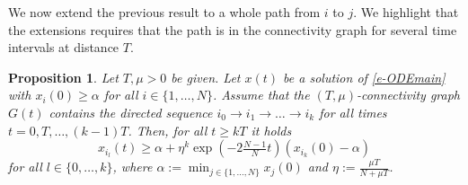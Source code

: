 \documentclass[journal]{article}
\newtheorem{proposition}[lemma]{Proposition}
\begin{document}
We now extend the previous result to a whole path from $i$ to $j$. We highlight that the extensions requires that the path is in the connectivity graph for several time intervals at distance $T$.
\begin{proposition}\label{p-keylemma}Let $T,\mu>0$ be given. Let $x(t)$ be a solution of \eqref{e-ODEmain} with $x_i(0)\geq \alpha$ for all $i\in\{1,\ldots,N\}$. Assume that the $(T,\mu)$-connectivity graph $G(t)$ contains the directed sequence ${i_0}\to {i_1}\to\ldots \to {i_k}$ for all times $t=0,T,\ldots,(k-1)T$. Then, for all $t\geq kT$ it holds
\begin{equation}
\label{e-frecursive}
x_{i_{l}}(t)\geq \alpha+\eta^k\exp(-2\tfrac{N-1}{N}t)(x_{i_k}(0)-\alpha)
\end{equation}
for all $l\in\{0,\ldots,k\}$, where $\alpha:=\min_{j\in\{1,\ldots,N\}} x_j(0)$ and $\eta:=\frac{\mu T}{N+\mu T}$.
\end{proposition}
\end{document}
